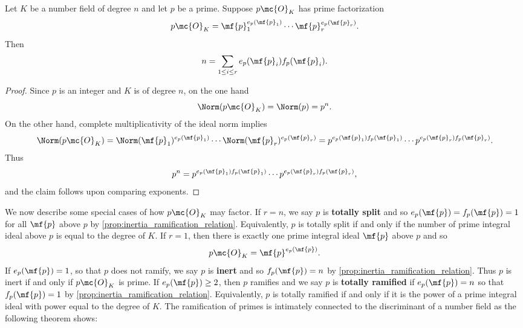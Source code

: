     \begin{proposition}\label{prop:inertia_ramification_relation}
      Let $K$ be a number field of degree $n$ and let $p$ be a prime. Suppose $p\mc{O}_{K}$ has prime factorization
      \[
        p\mc{O}_{K} = \mf{p}_{1}^{e_{p}(\mf{p}_{1})} \cdots \mf{p}_{r}^{e_{p}(\mf{p}_{r})}.
      \]
      Then
      \[
        n = \sum_{1 \le i \le r}e_{p}(\mf{p}_{i})f_{p}(\mf{p}_{i}).
      \]
    \end{proposition}
    \begin{proof}
      Since $p$ is an integer and $K$ is of degree $n$, on the one hand
      \[
        \Norm(p\mc{O}_{K}) = \Norm(p) = p^{n}.
      \]
      On the other hand, complete multiplicativity of the ideal norm implies
      \[
        \Norm(p\mc{O}_{K}) = \Norm(\mf{p}_{1})^{e_{p}(\mf{p}_{1})} \cdots \Norm(\mf{p}_{r})^{e_{p}(\mf{p}_{r})} = p^{e_{p}(\mf{p}_{1})f_{p}(\mf{p}_{1})} \cdots p^{e_{p}(\mf{p}_{r})f_{p}(\mf{p}_{r})}.
      \]
      Thus
      \[
        p^{n} = p^{e_{p}(\mf{p}_{1})f_{p}(\mf{p}_{1})} \cdots p^{e_{p}(\mf{p}_{r})f_{p}(\mf{p}_{r})},
      \]
      and the claim follows upon comparing exponents.
    \end{proof}

    We now describe some special cases of how $p\mc{O}_{K}$ may factor. If $r = n$, we say $p$ is \textbf{totally split} and so $e_{p}(\mf{p}) = f_{p}(\mf{p}) = 1$ for all $\mf{p}$ above $p$ by \cref{prop:inertia_ramification_relation}. Equivalently, $p$ is totally split if and only if the number of prime integral ideal above $p$ is equal to the degree of $K$. If $r = 1$, then there is exactly one prime integral ideal $\mf{p}$ above $p$ and so
    \[
      p\mc{O}_{K} = \mf{p}^{e_{p}(\mf{p})}.
    \]
    If $e_{p}(\mf{p}) = 1$, so that $p$ does not ramify, we say $p$ is \textbf{inert} and so $f_{p}(\mf{p}) = n$ by \cref{prop:inertia_ramification_relation}. Thus $p$ is inert if and only if $p\mc{O}_{K}$ is prime. If $e_{p}(\mf{p}) \ge 2$, then $p$ ramifies and we say $p$ is \textbf{totally ramified} if $e_{p}(\mf{p}) = n$ so that $f_{p}(\mf{p}) = 1$ by \cref{prop:inertia_ramification_relation}. Equivalently, $p$ is totally ramified if and only if it is the power of a prime integral ideal with power equal to the degree of $K$. The ramification of primes is intimately connected to the discriminant of a number field as the following theorem shows:

